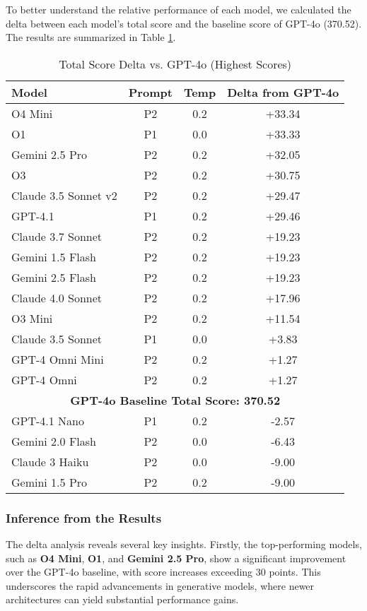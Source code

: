 To better understand the relative performance of each model, we calculated the delta between each model's total score and the baseline score of GPT-4o (370.52). The results are summarized in Table \ref{tab:deepeval_delta_results}.

\begin{table}[!htbp]
\centering
\small
\caption{Total Score Delta vs. GPT-4o (Highest Scores)}
\label{tab:deepeval_delta_results}
\begin{tabular}{|l|c|c|c|}
\hline
\textbf{Model} & \textbf{Prompt} & \textbf{Temp} & \textbf{Delta from GPT-4o} \\
\hline
O4 Mini & P2 & 0.2 & +33.34 \\
O1 & P1 & 0.0 & +33.33 \\
Gemini 2.5 Pro & P2 & 0.2 & +32.05 \\
O3 & P2 & 0.2 & +30.75 \\
Claude 3.5 Sonnet v2 & P2 & 0.2 & +29.47 \\
GPT-4.1 & P1 & 0.2 & +29.46 \\
Claude 3.7 Sonnet & P2 & 0.2 & +19.23 \\
Gemini 1.5 Flash & P2 & 0.2 & +19.23 \\
Gemini 2.5 Flash & P2 & 0.2 & +19.23 \\
Claude 4.0 Sonnet & P2 & 0.2 & +17.96 \\
O3 Mini & P2 & 0.2 & +11.54 \\
Claude 3.5 Sonnet & P1 & 0.0 & +3.83 \\
GPT-4 Omni Mini & P2 & 0.2 & +1.27 \\
GPT-4 Omni & P2 & 0.2 & +1.27 \\
\hline
\multicolumn{4}{|c|}{\textbf{GPT-4o Baseline Total Score: 370.52}} \\
\hline
GPT-4.1 Nano & P1 & 0.2 & -2.57 \\
Gemini 2.0 Flash & P2 & 0.0 & -6.43 \\
Claude 3 Haiku & P2 & 0.0 & -9.00 \\
Gemini 1.5 Pro & P2 & 0.2 & -9.00 \\
\hline
\end{tabular}
\end{table}

\subsubsection{Inference from the Results}
The delta analysis reveals several key insights. Firstly, the top-performing models, such as \textbf{O4 Mini}, \textbf{O1}, and \textbf{Gemini 2.5 Pro}, show a significant improvement over the GPT-4o baseline, with score increases exceeding 30 points. This underscores the rapid advancements in generative models, where newer architectures can yield substantial performance gains.

